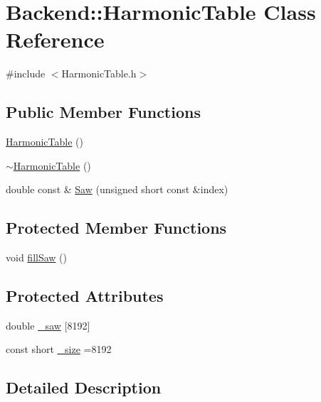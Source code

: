 \hypertarget{classBackend_1_1HarmonicTable}{\section{Backend\+:\+:Harmonic\+Table Class Reference}
\label{classBackend_1_1HarmonicTable}
}


{\ttfamily \#include $<$Harmonic\+Table.\+h$>$}

\subsection*{Public Member Functions}
\begin{DoxyCompactItemize}
\item 
\hyperlink{classBackend_1_1HarmonicTable_a3ea23b72d602447940c3d97ba75e5902}{Harmonic\+Table} ()
\item 
\hyperlink{classBackend_1_1HarmonicTable_a1c3662131adb3c8e64d1ad1cd8a65a20}{$\sim$\+Harmonic\+Table} ()
\item 
double const \& \hyperlink{classBackend_1_1HarmonicTable_a6b7336f4f6184337350f282d5b0c5467}{Saw} (unsigned short const \&index)
\end{DoxyCompactItemize}
\subsection*{Protected Member Functions}
\begin{DoxyCompactItemize}
\item 
void \hyperlink{classBackend_1_1HarmonicTable_a3b69fe79e5ddd9abfc13fc9a16de80c8}{fill\+Saw} ()
\end{DoxyCompactItemize}
\subsection*{Protected Attributes}
\begin{DoxyCompactItemize}
\item 
double \hyperlink{classBackend_1_1HarmonicTable_a464db802494a562d2c9d0840ee6d1483}{\+\_\+saw} \mbox{[}8192\mbox{]}
\item 
const short \hyperlink{classBackend_1_1HarmonicTable_a94c9f17b8fd4b514d145fbb8b0ed63dd}{\+\_\+size} =8192
\end{DoxyCompactItemize}


\subsection{Detailed Description}


